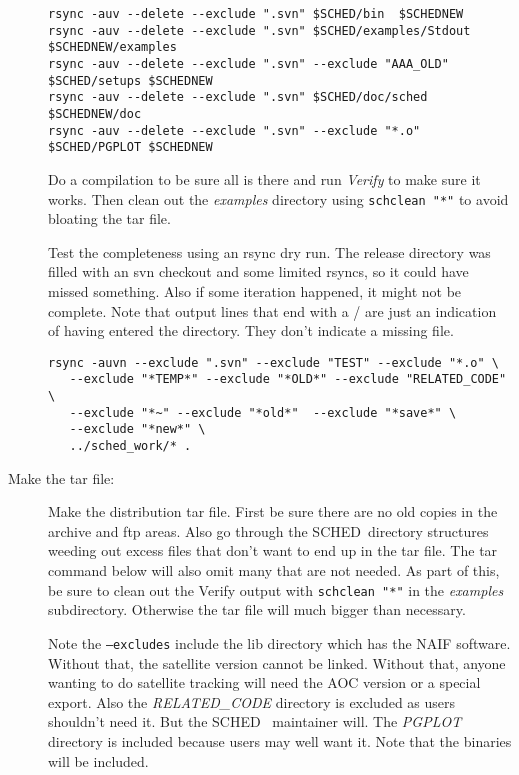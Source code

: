 \documentclass{report}
\newcommand{\schedb}{{\sc SCHED~}}
\begin{document}
\begin{description}
\begin{verbatim}
rsync -auv --delete --exclude ".svn" $SCHED/bin  $SCHEDNEW
rsync -auv --delete --exclude ".svn" $SCHED/examples/Stdout $SCHEDNEW/examples
rsync -auv --delete --exclude ".svn" --exclude "AAA_OLD" $SCHED/setups $SCHEDNEW
rsync -auv --delete --exclude ".svn" $SCHED/doc/sched $SCHEDNEW/doc
rsync -auv --delete --exclude ".svn" --exclude "*.o" $SCHED/PGPLOT $SCHEDNEW
\end{verbatim}

Do a compilation to be sure all is there and run {\sl Verify} to make
sure it works.  Then clean out the {\sl examples} directory using
{\tt schclean "*"} to avoid bloating the tar file.

Test the completeness using an rsync dry run.  The release directory
was filled with an svn checkout and some limited rsyncs, so it could
have missed something.  Also if some iteration happened, it might not
be complete. Note that output lines that end with a / are just an
indication of having entered the directory.  They don't indicate a
missing file.

\begin{verbatim}
rsync -auvn --exclude ".svn" --exclude "TEST" --exclude "*.o" \
   --exclude "*TEMP*" --exclude "*OLD*" --exclude "RELATED_CODE" \
   --exclude "*~" --exclude "*old*"  --exclude "*save*" \
   --exclude "*new*" \
   ../sched_work/* .
\end{verbatim}


\item [Make the tar file:]

Make the distribution tar file.  First be sure there are no old copies
in the archive and ftp areas.  Also go through the \schedb directory
structures weeding out excess files that don't want to end up in the
tar file.  The tar command below will also omit many that are not
needed.  As part of this, be sure to clean out the Verify output
with {\tt schclean "*"} in the {\sl examples} subdirectory.  Otherwise
the tar file will much bigger than necessary.

Note the {\tt --excludes} include the lib directory which has the NAIF
software.  Without that, the satellite version cannot be linked.
Without that, anyone wanting to do satellite tracking will need the
AOC version or a special export.  Also the {\sl RELATED\_CODE}
directory is excluded as users shouldn't need it.  But the \schedb
maintainer will.  The {\sl PGPLOT} directory is included because users
may well want it.   Note that the binaries will be included.


\end{description}
\end{document}
